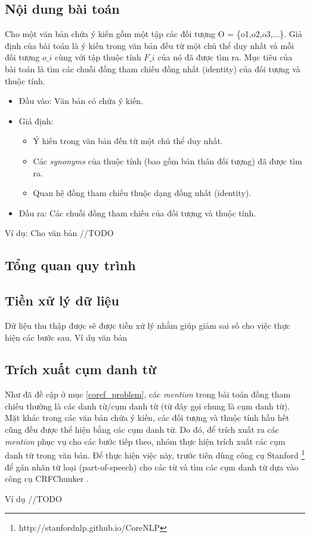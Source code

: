 \documentclass[12pt]{extarticle}
\begin{document}
		\subsection{Nội dung bài toán}
			\par Cho một văn bản chứa ý kiến gồm một tập các đối tượng O = \{o1,o2,o3,...\}. Giả định của bài toán là ý kiến trong văn bản đều từ một chủ thể duy nhất và mỗi đối tượng $o\_i$ cùng với tập thuộc tính $F\_i$ của nó đã được tìm ra. Mục tiêu của bài toán là tìm các chuỗi đồng tham chiếu đồng nhất (identity) của đối tượng và thuộc tính.
			\begin{itemize}
				\item{Đầu vào: Văn bản có chứa ý kiến.}
				\item{Giả định:
				\begin{itemize}
					\item{Ý kiến trong văn bản đến từ một chủ thể duy nhất.}
					\item{Các \textit{synonyms} của thuộc tính (bao gồm bản thân đối tượng) đã được tìm ra.}
					\item{Quan hệ đồng tham chiếu thuộc dạng đồng nhất (identity).}
				\end{itemize}}
				\item{Đầu ra: Các chuỗi đồng tham chiếu của đối tượng và thuộc tính.}
			\end{itemize}
			\par Ví dụ: Cho văn bản //TODO

		\subsection{Tổng quan quy trình}
			\begin{figure}[H]
				\centering				
				
			\end{figure}
		\subsection{Tiền xử lý dữ liệu}
		\par Dữ liệu thu thập được sẽ được tiền xử lý nhằm giúp giảm sai số cho việc thực hiện các bước sau. Ví dụ văn bản
		\subsection{Trích xuất cụm danh từ}
			\par Như đã đề cập ở mục \ref{coref_problem}, các \textit{mention} trong bài toán đồng tham chiếu thường là các danh từ/cụm danh từ (từ đây gọi chung là cụm danh từ). Mặt khác trong các văn bản chứa ý kiến, các đối tượng và thuộc tính hầu hết cũng đều được thể hiện bằng các cụm danh từ. Do đó, để trích xuất ra các \textit{mention} phục vụ cho các bước tiếp theo, nhóm thực hiện trích xuất các cụm danh từ trong văn bản. Để thực hiện việc này, trước tiên dùng công cụ Stanford \footnote{http://stanfordnlp.github.io/CoreNLP} để gán nhãn từ loại (part-of-speech) cho các từ và tìm các cụm danh từ dựa vào công cụ CRFChunker \cite{crfchunker}. 
			\par Ví dụ //TODO
\end{document}
